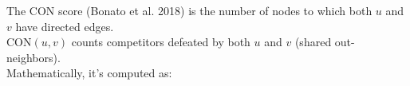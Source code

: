 \documentclass[preview]{standalone}
\begin{document}
The CON score (Bonato et al. 2018) is the number of nodes to which both $u$ and $v$ have directed edges.\\$\text{CON}(u, v)$ counts competitors defeated by both $u$ and $v$ (shared out-neighbors).\\Mathematically, it's computed as:\\
\end{document}
